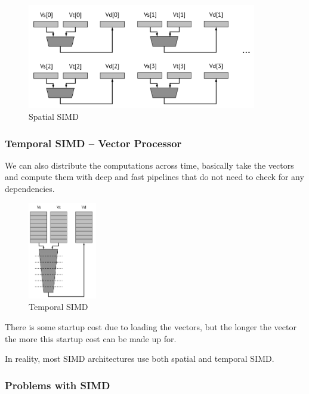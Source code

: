 \documentclass{article}
\begin{document}
 \begin{figure}[ht!]
\centering
\includegraphics[width=100mm]{img/simds.png}
\caption{Spatial SIMD}
\end{figure}

\subsubsection{Temporal SIMD -- Vector Processor}

We can also distribute the computations across time, basically take the vectors and compute them with deep and fast pipelines that do not need to check for any dependencies. 

 \begin{figure}[ht!]
\centering
\includegraphics[width=30mm]{img/simdt.png}
\caption{Temporal SIMD}
\end{figure}

There is some startup cost due to loading the vectors, but the longer the vector the more this startup cost can be made up for. 

In reality, most SIMD architectures use both spatial and temporal SIMD. 

\subsubsection{Problems with SIMD}
\end{document}
